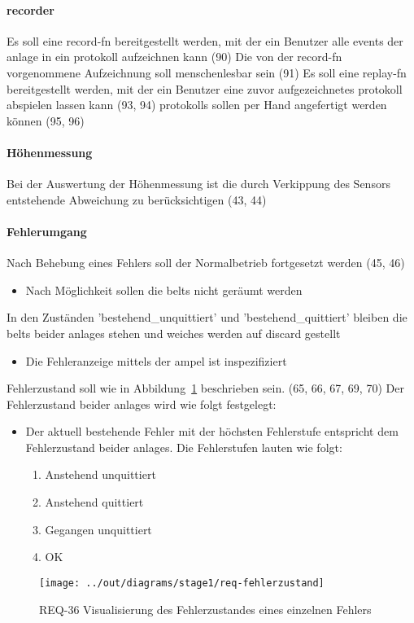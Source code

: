 \paragraph{\gls{recorder}}
\begin{itemize}
     Es soll eine \gls{record-fn} bereitgestellt werden, mit der ein Benutzer alle
    \glspl{event} der \gls{anlage} in ein \gls{protokoll} aufzeichnen kann (90)
     Die von der \gls{record-fn} vorgenommene Aufzeichnung soll menschenlesbar sein (91)
     Es soll eine \gls{replay-fn} bereitgestellt werden, mit der ein
    Benutzer eine zuvor aufgezeichnetes \gls{protokoll} abspielen lassen kann (93, 94)
     \glspl{protokoll} sollen per Hand angefertigt werden können (95, 96)
\end{itemize}

\paragraph{Höhenmessung}
\begin{itemize}
     Bei der Auswertung der Höhenmessung ist die durch Verkippung des Sensors entstehende Abweichung zu berücksichtigen (43, 44)
\end{itemize}

\paragraph{Fehlerumgang}
\begin{itemize}
     Nach Behebung eines Fehlers soll der Normalbetrieb fortgesetzt werden (45, 46)
    \begin{itemize}
        \item Nach Möglichkeit sollen die \glspl{belt} nicht geräumt werden
    \end{itemize}
     In den Zuständen 'bestehend\_unquittiert' und 'bestehend\_quittiert' bleiben die
    \glspl{belt} beider \glspl{anlage} stehen und \glspl{weiche} werden auf discard gestellt
    \begin{itemize}
        \item Die Fehleranzeige mittels der \gls{ampel} ist inspezifiziert
    \end{itemize}
     Fehlerzustand soll wie in Abbildung~\ref{fig:stm-fehlerzustand} beschrieben sein. (65, 66, 67, 69, 70)
     Der Fehlerzustand beider \glspl{anlage} wird wie folgt festgelegt:
    \begin{itemize}
        \item Der aktuell bestehende Fehler mit der höchsten Fehlerstufe entspricht dem Fehlerzustand beider \glspl{anlage}.
        Die Fehlerstufen lauten wie folgt:
    \begin{enumerate}
        \item Anstehend unquittiert
        \item Anstehend quittiert
        \item Gegangen unquittiert
        \item OK
    \end{enumerate}
    \end{itemize}
\end{itemize}

\begin{figure}[h]
    \centering
    \texttt{[image: ../out/diagrams/stage1/req-fehlerzustand]}
    \caption{REQ-36 Visualisierung des Fehlerzustandes eines einzelnen Fehlers}
    \label{fig:stm-fehlerzustand}
\end{figure}
